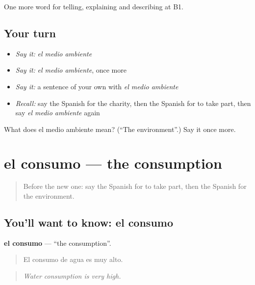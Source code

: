 \begin{grammarlens}[title={What you've built}]
One more word for telling, explaining and describing at B1.
\end{grammarlens}

\subsection*{Your turn}
\begin{itemize}
\raggedright
  \item \emph{Say it:} \emph{el medio ambiente}
  \item \emph{Say it:} \emph{el medio ambiente}, once more
  \item \emph{Say it:} a sentence of your own with \emph{el medio ambiente}
  \item \emph{Recall:} say the Spanish for the charity, then the Spanish for to take part, then say \emph{el medio ambiente} again
\end{itemize}

\begin{tcolorbox}[breakable,colback=teal!4,colframe=teal!35!black,title={Before you move on}]
What does el medio ambiente mean? (\textquotedblleft{}The environment\textquotedblright{}.) Say it once more.
\end{tcolorbox}
\section[el consumo]{el consumo — the consumption}

\label{lesson:ES-C607-consumo}



\begin{quote}
Before the new one: say the Spanish for to take part, then the Spanish for the environment.
\end{quote}

\subsection*{You'll want to know: el consumo}
\textbf{el consumo} — \textquotedblleft{}the consumption\textquotedblright{}.

\begin{quote}
El consumo de agua es muy alto.
\end{quote}

\begin{quote}
\emph{Water consumption is very high.}
\end{quote}

